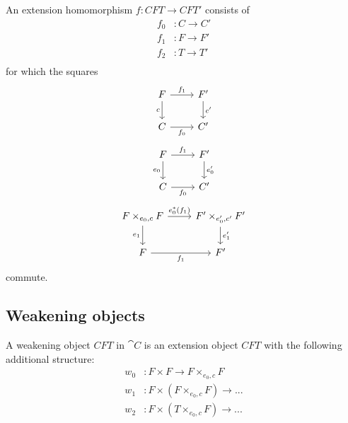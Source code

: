 \begin{defn}
An extension homomorphism $f:CFT\to CFT'$ consists of
\begin{align*}
f_0 & : C\to C'\\
f_1 & : F\to F'\\
f_2 & : T\to T'\\
\end{align*}
for which the squares
\begin{equation*}
\begin{tikzcd}
F \ar{d}[swap]{c} \ar{r}{f_1} & F' \ar{d}{c'}\\
C \ar{r}[swap]{f_0} & C'
\end{tikzcd}
\end{equation*}
\begin{equation*}
\begin{tikzcd}
F \ar{d}[swap]{e_0} \ar{r}{f_1} & F' \ar{d}{e_0'}\\
C \ar{r}[swap]{f_0} & C'
\end{tikzcd}
\end{equation*}
\begin{equation*}
\begin{tikzcd}
F\times_{e_0,c} F \ar{d}[swap]{e_1} \ar{r}{e_0^\ast(f_1)} & F'\times_{e_0',c'}F' \ar{d}{e_1'}\\
F \ar{r}[swap]{f_1} & F'
\end{tikzcd}
\end{equation*}
commute.
\end{defn}

\subsection{Weakening objects}
\begin{defn}
A weakening object $CFT$ in $\cat{C}$ is an extension object $CFT$ with the
following additional structure:
\begin{align*}
w_0 & : F\times F\to F\times_{e_0,c} F\\
w_1 & : F\times(F\times_{e_0,c} F) \to ...\\
w_2 & : F\times(T\times_{e_0,c} F) \to ...
\end{align*}
\end{defn}
